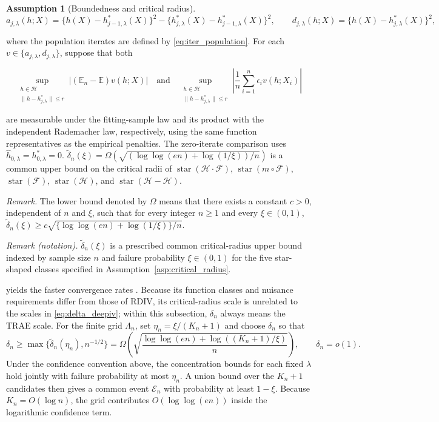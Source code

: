\documentclass[12pt]{article}
\theoremstyle{plain}
\theoremstyle{definition}
\newtheorem{assumption}[theorem]{Assumption}
\theoremstyle{remark}
\begin{document}
\begin{assumption}[Boundedness and critical radius]
\[
a_{j,\lambda}(h;X)
=\{h(X)-h_{j-1,\lambda}^*(X)\}^2
-\{h_{j,\lambda}^*(X)-h_{j-1,\lambda}^*(X)\}^2,
\qquad
d_{j,\lambda}(h;X)=\{h(X)-h_{j,\lambda}^*(X)\}^2,
\]

where the population iterates are defined by \eqref{eq:iter_population}. For each $v\in\{a_{j,\lambda},d_{j,\lambda}\}$, suppose that both

\[
\sup_{\substack{h\in\mathcal H\\\|h-h_{j,\lambda}^*\|\leqslant r}}
\left|(\mathbb E_n-\mathbb E)v(h;X)\right|
\quad\text{and}\quad
\sup_{\substack{h\in\mathcal H\\\|h-h_{j,\lambda}^*\|\leqslant r}}
\left|\frac1n\sum_{i=1}^n\epsilon_i v(h;X_i)\right|
\]

are measurable under the fitting-sample law and its product with the independent Rademacher law, respectively, using the same function representatives as the empirical penalties. The zero-iterate comparison uses $\hat h_{0,\lambda}=h_{0,\lambda}^*=0$. $ \tilde{\delta}_{n}(\xi) = \Omega \left(\sqrt{(\log\log(en) +\log( 1/\xi )) /n}\right)$ is a common upper bound on the critical radii of $ \operatorname{star}(\mathcal{H} \cdotp \mathcal{F})$, $ \operatorname{star}( m\circ \mathcal{F})$, $ \operatorname{star}(\mathcal{F})$, $ \operatorname{star}(\mathcal{H})$, and $\operatorname{star}(\mathcal H-\mathcal H)$.
\end{assumption}

\noindent\textit{Remark.} The lower bound denoted by $\Omega$ means that there exists a constant $c>0$, independent of $n$ and $\xi$, such that for every integer $n\geqslant1$ and every $\xi\in(0,1)$, $\tilde\delta_n(\xi)\geqslant c\sqrt{\{\log\log(en)+\log(1/\xi)\}/n}$.

\noindent\textit{Remark (notation).} $\tilde\delta_n(\xi)$ is a prescribed common critical-radius upper bound indexed by sample size $n$ and failure probability $\xi\in(0,1)$ for the five star-shaped classes specified in Assumption~\ref{asp:critical_radius}.

 yields the faster convergence rates \citep{foster2023orthogonal}. Because its function classes and nuisance requirements differ from those of RDIV, its critical-radius scale is unrelated to the scales in \eqref{eq:delta_deepiv}; within this subsection, $\delta_n$ always means the TRAE scale. For the finite grid $\Lambda_n$, set $\eta_n=\xi/(K_n+1)$ and choose $\delta_n$ so that
\begin{equation}\label{eq:delta_trae}
\delta_n \geqslant \max\{\tilde{\delta}_n(\eta_n),n^{-1/2}\}
 = \Omega \left(\sqrt{\frac{\log\log(en)+\log((K_n+1)/\xi)}{n}}\right),
 \qquad \delta_n=o(1).
\end{equation}
Under the confidence convention above, the concentration bounds for each fixed $\lambda$ hold jointly with failure probability at most $\eta_n$. A union bound over the $K_n+1$ candidates then gives a common event $\mathcal E_n$ with probability at least $1-\xi$. Because $K_n=O(\log n)$, the grid contributes $O(\log\log(en))$ inside the logarithmic confidence term.
\end{document}
